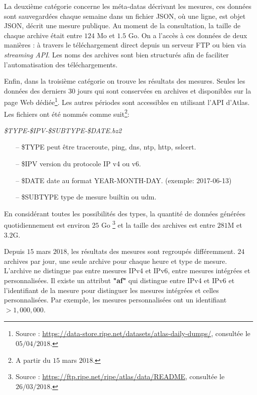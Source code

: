 La deuxième catégorie concerne  les  méta-datas  décrivant les mesures,  ces données sont sauvegardées chaque semaine dans un fichier JSON, où une ligne, est objet JSON, décrit une mesure publique. Au moment de la consultation, la taille de chaque archive était entre $124$ Mo et $1.5$ Go. On a l'accès à ces   données  de deux manières : à travers le téléchargement direct depuis un serveur FTP ou bien via \textit{streaming API}. Les noms des archives sont bien structurés afin de faciliter l'automatisation des téléchargements.

Enfin, dans la troisième catégorie on trouve les résultats des mesures.
Seules les données des derniers $30$ jours qui sont conservées en archives et disponibles sur la page Web dédiée\footnote{Source : \url{https://data-store.ripe.net/datasets/atlas-daily-dumps/}, consultée le $05/04/2018$.}. Les autres périodes sont accessibles en utilisant l'API d'Atlas.
Les fichiers ont été nommés  comme suit\footnote{A partir du $ 15 $ mars $ 2018 $.}: 

\begin{tcolorbox}
	\begin{center}
		\textit{\$TYPE-\$IPV-\$SUBTYPE-\$DATE.bz2}
	\end{center}
\end{tcolorbox}

\begin{itemize}
	\item[--] \$TYPE peut être {traceroute, ping, dns, ntp, http, sslcert}.
	\item[--] \$IPV version du protocole IP v4 ou v6.
	\item[--] \$DATE date au format  YEAR-MONTH-DAY. (exemple: 2017-06-13)
	\item[--] \$SUBTYPE type de mesure builtin ou udm.
\end{itemize}

En considérant toutes les possibilités des types, la quantité de données générées quotidiennement est environ $25$ Go \footnote{Source :  \url{https://ftp.ripe.net/ripe/atlas/data/README}, consultée le $26/03/2018$.}    et la taille des  archives est entre $281$M et $3.2$G.

Depuis $15$ mars $2018$, les résultats des mesures sont  regroupés différemment. $24$ archives par jour,  une seule archive pour chaque heure et  type de mesure. L'archive ne distingue pas entre mesures IPv4 et IPv6,  entre mesures intégrées et  personnalisées. Il existe un attribut \textbf{"af"} qui distingue entre IPv4 et IPv6 et l'identifiant de la mesure pour distinguer les  mesures intégrées et celles personnalisées. Par exemple, les mesures personnalisées ont un identifiant $ > 1,000,000$. 

